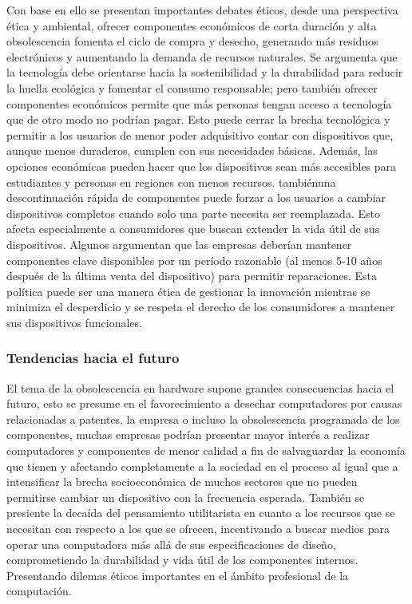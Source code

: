 \documentclass[10pt,journal,compsoc]{IEEEtran}
\begin{document}
Con base en ello se presentan importantes debates éticos, desde una perspectiva ética y ambiental, ofrecer componentes económicos de corta duración y alta obsolescencia fomenta el ciclo de compra y desecho, generando más residuos electrónicos y aumentando la demanda de recursos naturales. Se argumenta que la tecnología debe orientarse hacia la sostenibilidad y la durabilidad para reducir la huella ecológica y fomentar el consumo responsable; pero también ofrecer componentes económicos permite que más personas tengan acceso a tecnología que de otro modo no podrían pagar. Esto puede cerrar la brecha tecnológica y permitir a los usuarios de menor poder adquisitivo contar con dispositivos que, aunque menos duraderos, cumplen con sus necesidades básicas. Además, las opciones económicas pueden hacer que los dispositivos sean más accesibles para estudiantes y personas en regiones con menos recursos. tambiénuna descontinuación rápida de componentes puede forzar a los usuarios a cambiar dispositivos completos cuando solo una parte necesita ser reemplazada. Esto afecta especialmente a consumidores que buscan extender la vida útil de sus dispositivos. Algunos argumentan que las empresas deberían mantener componentes clave disponibles por un período razonable (al menos 5-10 años después de la última venta del dispositivo) para permitir reparaciones. Esta política puede ser una manera ética de gestionar la innovación mientras se minimiza el desperdicio y se respeta el derecho de los consumidores a mantener sus dispositivos funcionales.


\subsubsection{Tendencias hacia el futuro}
El tema de la obsolescencia en hardware supone grandes consecuencias hacia el futuro, esto se
presume en el favorecimiento a desechar computadores por causas relacionadas a patentes, la
empresa o incluso la obsolescencia programada de los componentes\cite{tacha2009mitigate},
muchas empresas podrían presentar mayor interés a realizar computadores y componentes de menor calidad a fin de salvaguardar la economía que tienen y afectando completamente a la sociedad en el proceso al igual que a intensificar la brecha socioeconómica de muchos sectores que no pueden permitirse cambiar un dispositivo con la frecuencia esperada.
También se presiente la decaída del pensamiento utilitarista en cuanto a los recursos que se
necesitan con respecto a los que se ofrecen, incentivando a buscar medios para operar una
computadora más allá de sus especificaciones de diseño, comprometiendo la durabilidad y vida útil
de los componentes internos. Presentando dilemas éticos importantes en el ámbito profesional de
la computación. \cite{4116968} \cite{9425823}
\end{document}
